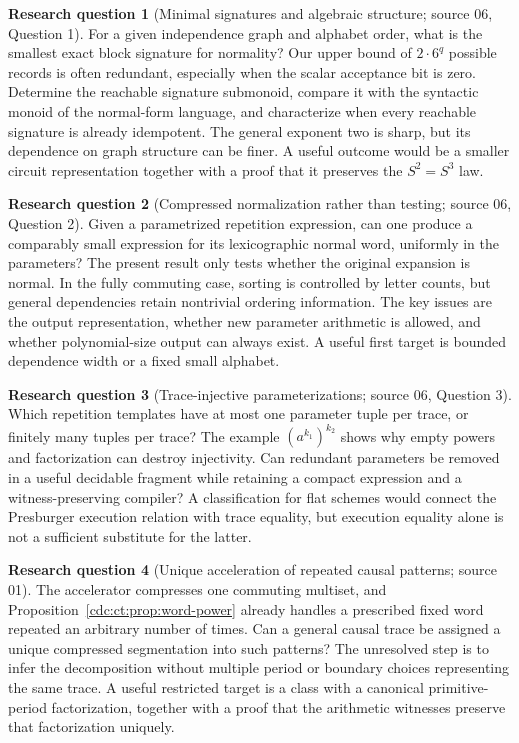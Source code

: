 \documentclass[11pt,a4paper]{article}
\theoremstyle{definition}
\newtheorem{question}[question]{Research question}
\theoremstyle{remark}
\begin{document}
\begin{question}[Minimal signatures and algebraic structure; source 06, Question 1]
For a given independence graph and alphabet order, what
is the smallest exact block signature for normality? Our upper bound of
$2\cdot6^q$ possible records is often redundant, especially when the scalar
acceptance bit is zero. Determine the reachable signature submonoid, compare
it with the syntactic monoid of the normal-form language, and characterize
when every reachable signature is already idempotent. The general exponent
two is sharp, but its dependence on graph structure can be finer. A useful
outcome would be a smaller circuit representation together with a proof that
it preserves the $S^2=S^3$ law.
\end{question}

\begin{question}[Compressed normalization rather than testing; source 06, Question 2]
Given a parametrized repetition expression, can one
produce a comparably small expression for its lexicographic normal word,
uniformly in the parameters? The present result only tests whether the
original expansion is normal. In the fully commuting case, sorting is
controlled by letter counts, but general dependencies retain nontrivial
ordering information. The key issues are the output representation, whether
new parameter arithmetic is allowed, and whether polynomial-size output can
always exist. A useful first target is bounded dependence width or a fixed
small alphabet.
\end{question}

\begin{question}[Trace-injective parameterizations; source 06, Question 3]
Which repetition templates have at most one parameter
tuple per trace, or finitely many tuples per trace? The example
$(a^{k_1})^{k_2}$ shows why empty powers and factorization can destroy
injectivity. Can redundant parameters be removed in a useful decidable
fragment while retaining a compact expression and a witness-preserving
compiler? A classification for flat schemes would connect the Presburger
execution relation with trace equality, but execution equality alone is not
a sufficient substitute for the latter.
\end{question}

\begin{question}[Unique acceleration of repeated causal patterns; source 01]
The accelerator compresses one commuting multiset, and Proposition~\ref{cdc:ct:prop:word-power} already handles a prescribed fixed word repeated an arbitrary number of times. Can a general causal trace be assigned a unique compressed segmentation into such patterns? The unresolved step is to infer the decomposition without multiple period or boundary choices representing the same trace. A useful restricted target is a class with a canonical primitive-period factorization, together with a proof that the arithmetic witnesses preserve that factorization uniquely.
\end{question}
\end{document}
